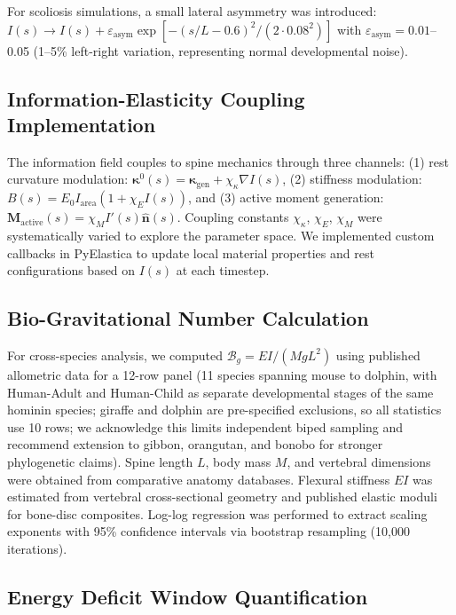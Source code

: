 For scoliosis simulations, a small lateral asymmetry was introduced: $I(s) \to I(s) + \varepsilon_{\mathrm{asym}} \exp[-(s/L - 0.6)^2/(2 \cdot 0.08^2)]$ with $\varepsilon_{\mathrm{asym}} = 0.01$--0.05 (1--5\% left-right variation, representing normal developmental noise).

\subsection{Information-Elasticity Coupling Implementation}

The information field couples to spine mechanics through three channels: (1) rest curvature modulation: $\bm{\kappa}^0(s) = \bm{\kappa}_{\mathrm{gen}} + \chi_\kappa \nabla I(s)$, (2) stiffness modulation: $B(s) = E_0 I_{\mathrm{area}} (1 + \chi_E I(s))$, and (3) active moment generation: $\mathbf{M}_{\mathrm{active}}(s) = \chi_M I'(s) \hat{\mathbf{n}}(s)$. Coupling constants $\chi_\kappa$, $\chi_E$, $\chi_M$ were systematically varied to explore the parameter space. We implemented custom callbacks in PyElastica to update local material properties and rest configurations based on $I(s)$ at each timestep.

\subsection{Bio-Gravitational Number Calculation}

For cross-species analysis, we computed $\mathcal{B}_g = EI/(MgL^2)$ using published allometric data for a 12-row panel (11 species spanning mouse to dolphin, with Human-Adult and Human-Child as separate developmental stages of the same hominin species; giraffe and dolphin are pre-specified exclusions, so all statistics use 10 rows; we acknowledge this limits independent biped sampling and recommend extension to gibbon, orangutan, and bonobo for stronger phylogenetic claims). Spine length $L$, body mass $M$, and vertebral dimensions were obtained from comparative anatomy databases. Flexural stiffness $EI$ was estimated from vertebral cross-sectional geometry and published elastic moduli for bone-disc composites. Log-log regression was performed to extract scaling exponents with 95\% confidence intervals via bootstrap resampling (10,000 iterations).

\subsection{Energy Deficit Window Quantification}

